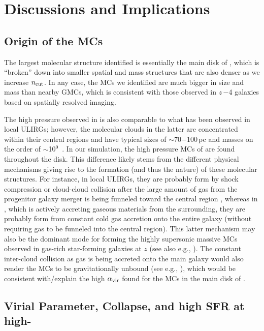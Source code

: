 \IfFileExists{emulateapjlegacy.cls}{\documentclass[iop]{emulateapjlegacy}}{\documentclass[iop]{emulateapj}}
\begin{document}
\section{Discussions and Implications}     \label{sec:diss}

\subsection{Origin of the MCs} \label{sec:origin}
The largest molecular structure identified is essentially the main disk of \flower, which is ``broken'' down into smaller
spatial and mass structures that are also denser as we increase $n_{\rm cut}$. In any case,
the MCs we identified are much bigger in size and mass than nearby GMCs, which is consistent with
those observed in $z$\,$-$4 galaxies based on spatially resolved imaging.

The high pressure observed in \flower is also comparable to what has been observed in local ULIRGs; however, the 
molecular clouds in the latter are concentrated within their central regions and have typical sizes of $\sim$70$-$100\,pc and masses on the order of $\sim$10$^9$\,\Msun
\citep{Downes98a, Sakamoto08a}. In our simulation, the high pressure MCs of \flower are 
found throughout the disk. This difference likely stems from the different physical mechanisms giving rise 
to the formation (and thus the nature) of these molecular structures. 
For instance, in local ULIRGs, they are probably form by shock compression or cloud-cloud 
collision after the large amount of gas from the progenitor galaxy merger 
is being funneled toward the central region \citep{Tan00a, Wu18a},  %
whereas in \flower, which is actively accreting gaseous materials 
from the surrounding, they are probably form from constant cold gas accretion onto the entire galaxy (without 
requiring gas to be funneled into the central region).
This latter mechanism may also be the dominant mode for forming the highly supersonic massive MCs observed 
in gas-rich star-forming galaxies at $z$ (see also e.g., \citealt{Swinbank11a}).
The constant inter-cloud collision as gas is being accreted onto the main galaxy would also render 
the MCs to be gravitationally unbound (see e.g., \citealt{Dobbs11a}), which would be consistent with/explain the 
high $\alpha_{\rm vir}$ found for the MCs in the main disk of \flower.


\subsection{Virial Parameter, Collapse, and high SFR at high-\z}
\end{document}
